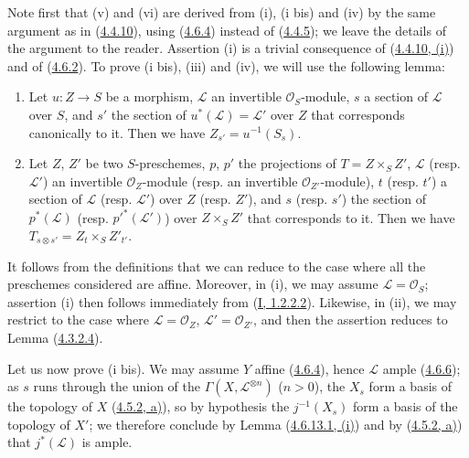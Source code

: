 Note first that (v) and (vi) are derived from (i), (i bis) and (iv) by the
same argument as in (\hyperref[II.4.4.10]{4.4.10}), using
(\hyperref[II.4.6.4]{4.6.4}) instead of
(\hyperref[II.4.4.5]{4.4.5}); we leave the details of the argument to the
reader. Assertion (i) is a trivial consequence of
(\hyperref[II.4.4.10]{4.4.10, (i)}) and of
(\hyperref[II.4.6.2]{4.6.2}). To prove (i bis), (iii) and (iv), we
will use the following lemma:

\begin{lemma}[4.6.13.1]
\label{II.4.6.13.1}
\begin{enumerate}
  \item[\rm{(i)}] Let $u:Z\to S$ be a morphism, $\mathcal{L}$ an invertible
  $\mathcal{O}_S$-module, $s$ a section of $\mathcal{L}$
  over $S$, and $s'$ the section of $u^*(\mathcal{L})=\mathcal{L}'$
  over $Z$ that corresponds canonically to it. Then we have
  $Z_{s'}=u^{-1}(S_s)$.
  \item[\rm{(ii)}] Let $Z$, $Z'$ be two $S$-preschemes, $p$, $p'$ the
  projections of $T=Z\times_S Z'$, $\mathcal{L}$ (resp.
  $\mathcal{L}'$) an invertible $\mathcal{O}_Z$-module (resp. an invertible
  $\mathcal{O}_{Z'}$-module), $t$ (resp. $t'$) a section of
  $\mathcal{L}$ (resp. $\mathcal{L}'$) over $Z$ (resp. $Z'$), and $s$
  (resp. $s'$) the section of $p^*(\mathcal{L})$ (resp.
  $p'^*(\mathcal{L}')$) over $Z\times_S Z'$ that corresponds to it.
  Then we have $T_{s\otimes s'}=Z_t\times_S Z'_{t'}$.
\end{enumerate}
\end{lemma}

It follows from the definitions that we can reduce to the case where all the
preschemes considered are affine. Moreover, in (i), we may assume
$\mathcal{L}=\mathcal{O}_S$; assertion (i) then follows immediately from
(\hyperref[I.1.2.2.2]{I, 1.2.2.2}). Likewise, in (ii), we may
restrict to the case where $\mathcal{L}=\mathcal{O}_Z$,
$\mathcal{L}'=\mathcal{O}_{Z'}$, and then the assertion reduces to
Lemma (\hyperref[II.4.3.2.4]{4.3.2.4}).

Let us now prove (i bis). We may assume $Y$ affine
(\hyperref[II.4.6.4]{4.6.4}), hence $\mathcal{L}$ ample
(\hyperref[II.4.6.6]{4.6.6}); as $s$ runs through the union
of the $\Gamma(X,\mathcal{L}^{\otimes n})$ ($n>0$), the $X_s$ form a
basis of the topology of $X$ (\hyperref[II.4.5.2]{4.5.2, a)}), so by
hypothesis the $j^{-1}(X_s)$ form a basis of the topology of $X'$; we
therefore conclude by Lemma
(\hyperref[II.4.6.13.1]{4.6.13.1, (i)}) and by
(\hyperref[II.4.5.2]{4.5.2, a)}) that $j^*(\mathcal{L})$ is ample.

